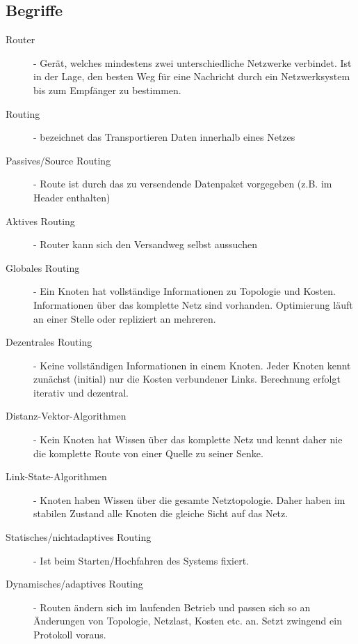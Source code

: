 \documentclass{article} %
\begin{document}
\subsection{Begriffe}
\begin{description}
	\item[Router] - Gerät, welches mindestens zwei unterschiedliche Netzwerke verbindet.
					Ist in der Lage, den besten Weg für eine Nachricht durch ein Netzwerksystem bis zum Empfänger zu bestimmen.
	\item[Routing] - bezeichnet das Transportieren Daten innerhalb eines Netzes
	\item[Passives/Source Routing] - Route ist durch das zu versendende Datenpaket vorgegeben (z.B. im Header enthalten)
	\item[Aktives Routing] - Router kann sich den Versandweg selbst aussuchen
	\item[Globales Routing] - Ein Knoten hat vollständige Informationen zu Topologie und Kosten. 
							Informationen über das komplette Netz sind vorhanden.
							Optimierung läuft an einer Stelle oder repliziert an mehreren.
	\item[Dezentrales Routing] - Keine vollständigen Informationen in einem Knoten.
								 Jeder Knoten kennt zunächst (initial) nur die Kosten verbundener Links.
								Berechnung erfolgt iterativ und dezentral.
	\item[Distanz-Vektor-Algorithmen] - Kein Knoten hat Wissen über das komplette Netz und kennt daher nie die komplette Route von einer Quelle zu seiner Senke. 
	\item[Link-State-Algorithmen] - Knoten haben Wissen über die gesamte Netztopologie.
									Daher haben im stabilen Zustand alle Knoten die gleiche Sicht auf das Netz.
	\item[Statisches/nichtadaptives Routing] - Ist beim Starten/Hochfahren des Systems fixiert.
	\item[Dynamisches/adaptives Routing] - Routen ändern sich im laufenden Betrieb und passen sich so an Änderungen von Topologie, Netzlast, Kosten etc. an.
	                                       Setzt zwingend ein Protokoll voraus.	
\end{description}
\end{document}
